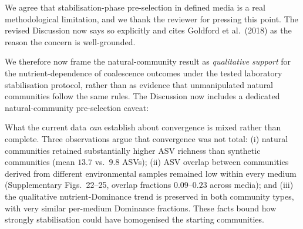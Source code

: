 \responselabel
We agree that stabilisation-phase pre-selection in defined media is a real methodological limitation, and we thank the reviewer for pressing this point. The revised Discussion now says so explicitly and cites Goldford et al.\ (2018) as the reason the concern is well-grounded.


We therefore now frame the natural-community result as \emph{qualitative support} for the nutrient-dependence of coalescence outcomes under the tested laboratory stabilisation protocol, rather than as evidence that unmanipulated natural communities follow the same rules. The Discussion now includes a dedicated natural-community pre-selection caveat: 


What the current data \emph{can} establish about convergence is mixed rather than complete. Three observations argue that convergence was not total: (i) natural communities retained substantially higher ASV richness than synthetic communities (mean $13.7$ vs.\ $9.8$ ASVs); (ii) ASV overlap between communities derived from different environmental samples remained low within every medium (Supplementary Figs.~22--25, overlap fractions $0.09$--$0.23$ across media); and (iii) the qualitative nutrient-Dominance trend is preserved in both community types, with very similar per-medium Dominance fractions. These facts bound how strongly stabilisation could have homogenised the starting communities.

